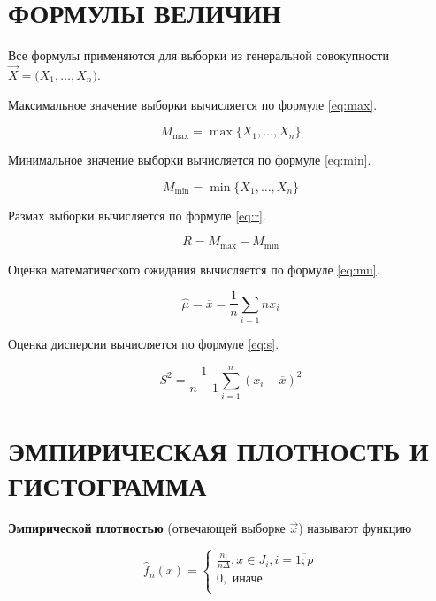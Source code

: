 \section{ФОРМУЛЫ ВЕЛИЧИН}

Все формулы применяются для выборки из генеральной совокупности
$\vec X = \big( X_1, \dots, X_n \big)$.

Максимальное значение выборки вычисляется по формуле \ref{eq:max}.

\begin{equation}\label{eq:max}
    M_{\max} = \max \{ X_1, \dots, X_n \}
\end{equation}

Минимальное значение выборки вычисляется по формуле \ref{eq:min}.

\begin{equation}\label{eq:min}
    M_{\min} = \min \{ X_1, \dots, X_n \}
\end{equation}

Размах выборки вычисляется по формуле \ref{eq:r}.

\begin{equation}\label{eq:r}
    R = M_{\max} - M_{\min}
\end{equation}

Оценка математического ожидания вычисляется по формуле \ref{eq:mu}.

\begin{equation}\label{eq:mu}
    \hat \mu = \overline x = \frac{1}{n} \sum_{i=1}{n} x_i
\end{equation}

Оценка дисперсии вычисляется по формуле \ref{eq:s}.

\begin{equation}\label{eq:s}
    S^2 = \frac{1}{n-1} \sum_{i=1}^n (x_i - \overline{x})^2
\end{equation}

\section{ЭМПИРИЧЕСКАЯ ПЛОТНОСТЬ И ГИСТОГРАММА}

\textbf{Эмпирической плотностью}
(отвечающей выборке $\vec x$) называют функцию

\begin{equation*}
    \hat f_n(x) =
    \begin{cases}
        \frac{n_i}{n \Delta}, x \in J_i, i = \overline{1; p} \\
        0, \text{ иначе} \\
    \end{cases}
\end{equation*}

